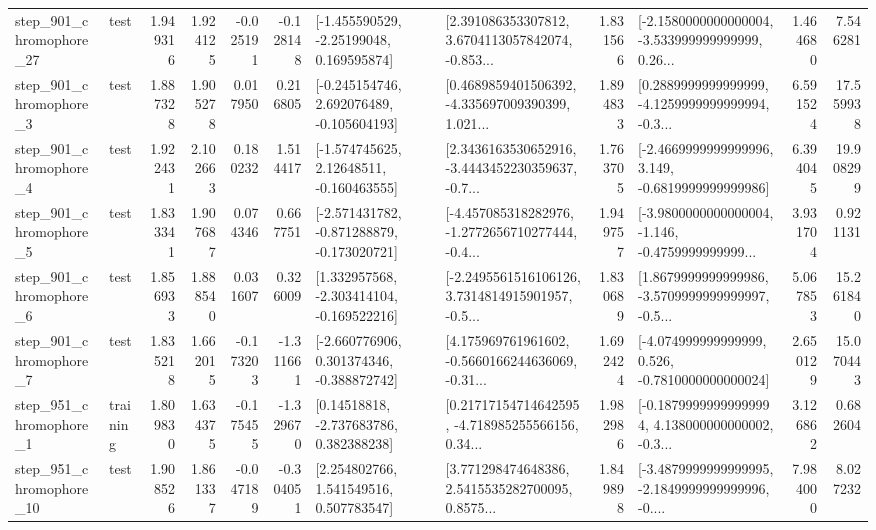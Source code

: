 \begin{tabular}{llrrrrllrlrr}
  step\_901\_chromophore\_27 &      test &      1.949316 &    1.924125 &     -0.025191 & -0.128148 &    [-1.455590529, -2.25199048, 0.169595874] &  [2.391086353307812, 3.6704113057842074, -0.853... &       1.831566 &  [-2.1580000000000004, -3.533999999999999, 0.26... &            1.464680 &          7.546281 \\
   step\_901\_chromophore\_3 &      test &      1.887328 &    1.905278 &      0.017950 &  0.216805 &   [-0.245154746, 2.692076489, -0.105604193] &  [0.4689859401506392, -4.335697009390399, 1.021... &       1.894833 &  [0.2889999999999999, -4.1259999999999994, -0.3... &            6.591524 &         17.559938 \\
   step\_901\_chromophore\_4 &      test &      1.922431 &    2.102663 &      0.180232 &  1.514417 &    [-1.574745625, 2.12648511, -0.160463555] &  [2.3436163530652916, -3.4443452230359637, -0.7... &       1.763705 &  [-2.4669999999999996, 3.149, -0.6819999999999986] &            6.394045 &         19.908299 \\
   step\_901\_chromophore\_5 &      test &      1.833341 &    1.907687 &      0.074346 &  0.667751 &  [-2.571431782, -0.871288879, -0.173020721] &  [-4.457085318282976, -1.2772656710277444, -0.4... &       1.949757 &  [-3.9800000000000004, -1.146, -0.4759999999999... &            3.931704 &          0.921131 \\
   step\_901\_chromophore\_6 &      test &      1.856933 &    1.888540 &      0.031607 &  0.326009 &   [1.332957568, -2.303414104, -0.169522216] &  [-2.2495561516106126, 3.7314814915901957, -0.5... &       1.830689 &  [1.8679999999999986, -3.5709999999999997, -0.5... &            5.067853 &         15.261840 \\
   step\_901\_chromophore\_7 &      test &      1.835218 &    1.662015 &     -0.173203 & -1.311661 &   [-2.660776906, 0.301374346, -0.388872742] &  [4.175969761961602, -0.5660166244636069, -0.31... &       1.692424 &   [-4.074999999999999, 0.526, -0.7810000000000024] &            2.650129 &         15.070443 \\
   step\_951\_chromophore\_1 &  training &      1.809830 &    1.634375 &     -0.175455 & -1.329670 &     [0.14518818, -2.737683786, 0.382388238] &  [0.21717154714642595, -4.718985255566156, 0.34... &       1.982986 &  [-0.18799999999999994, 4.138000000000002, -0.3... &            3.126862 &          0.682604 \\
  step\_951\_chromophore\_10 &      test &      1.908526 &    1.861337 &     -0.047189 & -0.304051 &     [2.254802766, 1.541549516, 0.507783547] &  [3.771298474648386, 2.5415535282700095, 0.8575... &       1.849898 &  [-3.4879999999999995, -2.1849999999999996, -0.... &            7.984000 &          8.027232 \\

\end{tabular}

